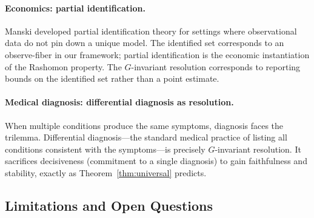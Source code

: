 \documentclass{article}
\begin{document}
\paragraph{Economics: partial identification.}
Manski \citep{manski2003partial} developed partial identification theory for
settings where observational data do not pin down a unique model.  The
identified set corresponds to an observe-fiber in our framework; partial
identification is the economic instantiation of the Rashomon property.  The
$G$-invariant resolution corresponds to reporting bounds on the identified
set rather than a point estimate.

\paragraph{Medical diagnosis: differential diagnosis as resolution.}
When multiple conditions produce the same symptoms, diagnosis faces the
trilemma.  Differential diagnosis---the standard medical practice of
listing all conditions consistent with the symptoms---is precisely
$G$-invariant resolution.  It sacrifices decisiveness (commitment to a
single diagnosis) to gain faithfulness and stability, exactly as
Theorem~\ref{thm:universal} predicts.

\subsection{Limitations and Open Questions}
\label{sec:limitations}
\end{document}
